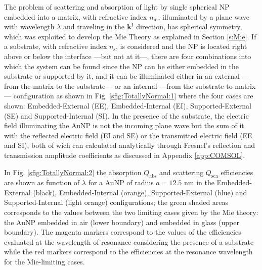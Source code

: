
The problem of scattering and absorption of light by single spherical NP embedded into a matrix, with refractive index $n_\text{m}$, illuminated by a plane wave with wavelength $\lambda$  and traveling in the  $\vb{k}^\text{i}$ direction, has spherical symmetry, which was exploited to develop the Mie Theory as explained in Section \ref{s:Mie}. If a substrate, with refractive index $n_\text{s}$, is considered and the NP is located right above or below the interface ---but not at it---, there are four combinations into which the system can be found since the NP can be either embedded  in the substrate or supported by it, and it can be illuminated either in an external ---from the matrix to the substrate--- or an internal ---from the substrate to matrix--- configuration as shown in Fig. \ref{sfig:TotallyNormal:1} where the four cases are shown: Embedded-External (EE), Embedded-Internal (EI), Supported-External (SE) and Supported-Internal (SI). In the  presence of the substrate, the electric field illuminating the AuNP is not the incoming plane wave but the sum of it with the reflected electric field (EI and SE) or the transmitted electric field (EE and SI), both of wich can calculated analytically through Fresnel's reflection and transmission amplitude coefficients as discussed in Appendix \ref{app:COMSOL}.

In Fig. \ref{sfig:TotallyNormal:2} the absorption $Q_\text{abs}$ and scattering $Q_\text{sca}$ efficiencies are shown as function of $\lambda$ for a AuNP of radius $a = 12.5$ nm in the Embedded-External (black), Embedded-Internal (orange), Supported-External (blue) and Supported-Internal (light orange) configurations; the green shaded areas corresponds to the values between the two limiting cases given by the Mie theory: the AuNP embedded in air (lower boundary) and embedded in glass (upper boundary). The magenta markers correspond to the values of the efficiencies evaluated at the wavelength of resonance considering the presence of a substrate while the red markers correspond to the efficiencies at the resonance wavelength for the Mie-limiting cases.

